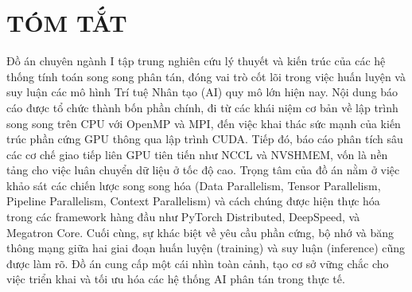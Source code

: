 \section*{TÓM TẮT}
Đồ án chuyên ngành I tập trung nghiên cứu lý thuyết và kiến trúc của các hệ thống tính toán song song phân tán, đóng vai trò cốt lõi trong việc huấn luyện và suy luận các mô hình Trí tuệ Nhân tạo (AI) quy mô lớn hiện nay. Nội dung báo cáo được tổ chức thành bốn phần chính, đi từ các khái niệm cơ bản về lập trình song song trên CPU với OpenMP và MPI, đến việc khai thác sức mạnh của kiến trúc phần cứng GPU thông qua lập trình CUDA. Tiếp đó, báo cáo phân tích sâu các cơ chế giao tiếp liên GPU tiên tiến như NCCL và NVSHMEM, vốn là nền tảng cho việc luân chuyển dữ liệu ở tốc độ cao. Trọng tâm của đồ án nằm ở việc khảo sát các chiến lược song song hóa (Data Parallelism, Tensor Parallelism, Pipeline Parallelism, Context Parallelism) và cách chúng được hiện thực hóa trong các framework hàng đầu như PyTorch Distributed, DeepSpeed, và Megatron Core. Cuối cùng, sự khác biệt về yêu cầu phần cứng, bộ nhớ và băng thông mạng giữa hai giai đoạn huấn luyện (training) và suy luận (inference) cũng được làm rõ. Đồ án cung cấp một cái nhìn toàn cảnh, tạo cơ sở vững chắc cho việc triển khai và tối ưu hóa các hệ thống AI phân tán trong thực tế.

\newpage
\cleardoublepage